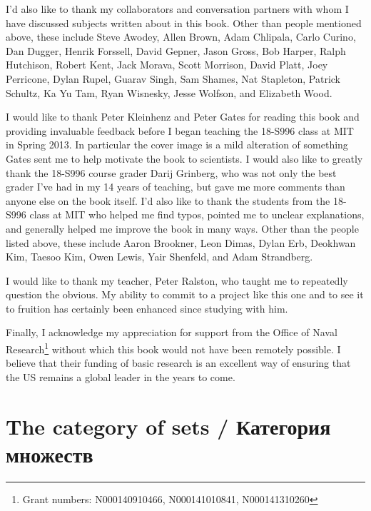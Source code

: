 \documentclass[a4paper]{book}
\theoremstyle{myth}
\begin{document}
\begin{russian}
 

I'd also like to thank my collaborators and conversation partners with whom I have discussed subjects written about in this book. Other than people mentioned above, these include Steve Awodey, Allen Brown, Adam Chlipala, Carlo Curino, Dan Dugger, Henrik Forssell, David Gepner, Jason Gross, Bob Harper, Ralph Hutchison, Robert Kent, Jack Morava, Scott Morrison, David Platt, Joey Perricone, Dylan Rupel, Guarav Singh, Sam Shames, Nat Stapleton, Patrick Schultz, Ka Yu Tam, Ryan Wisnesky, Jesse Wolfson, and Elizabeth Wood.

 

I would like to thank Peter Kleinhenz and Peter Gates for reading this book and providing invaluable feedback before I began teaching the 18-S996 class at MIT in Spring 2013. In particular the cover image is a mild alteration of something Gates sent me to help motivate the book to scientists. I would also like to greatly thank the 18-S996 course grader Darij Grinberg, who was not only the best grader I've had in my 14 years of teaching, but gave me more comments than anyone else on the book itself. I'd also like to thank the students from the 18-S996 class at MIT who helped me find typos, pointed me to unclear explanations, and generally helped me improve the book in many ways. Other than the people listed above, these include Aaron Brookner, Leon Dimas, Dylan Erb, Deokhwan Kim, Taesoo Kim, Owen Lewis, Yair Shenfeld, and Adam Strandberg.

 

I would like to thank my teacher, Peter Ralston, who taught me to repeatedly question the obvious. My ability to commit to a project like this one and to see it to fruition has certainly been enhanced since studying with him.

 

Finally, I acknowledge my appreciation for support from the Office of Naval Research\footnote{Grant numbers: N000140910466, N000141010841, N000141310260}
without which this book would not have been remotely possible. I believe that their funding of basic research is an excellent way of ensuring that the US remains a global leader in the years to come.

 



\chapter{The category of sets / Категория множеств}\label{chap:sets}


\end{russian}
\end{document}
